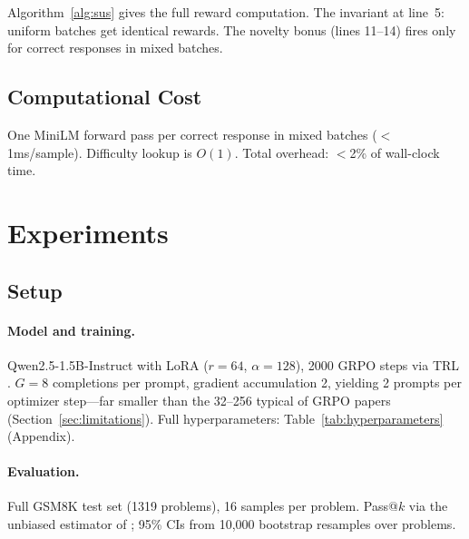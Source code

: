 \documentclass[10pt]{article}
\begin{document}


Algorithm~\ref{alg:sus} gives the full reward computation. The invariant at line~5: uniform batches get identical rewards. The novelty bonus (lines 11--14) fires only for correct responses in mixed batches.

\subsection{Computational Cost}

One MiniLM forward pass per correct response in mixed batches ($<$1ms/sample). Difficulty lookup is $O(1)$. Total overhead: $<$2\% of wall-clock time.

\section{Experiments}
\label{sec:experiments}

\subsection{Setup}
\label{sec:setup}

\paragraph{Model and training.}
Qwen2.5-1.5B-Instruct \citep{yang2025qwen2} with LoRA \citep{hu2022lora} ($r{=}64$, $\alpha{=}128$), 2000 GRPO steps via TRL \citep{vonwerra2022trl}. $G{=}8$ completions per prompt, gradient accumulation 2, yielding 2 prompts per optimizer step---far smaller than the 32--256 typical of GRPO papers (Section~\ref{sec:limitations}). Full hyperparameters: Table~\ref{tab:hyperparameters} (Appendix).

\paragraph{Evaluation.}
Full GSM8K test set \citep{cobbe2021training} (1319 problems), 16 samples per problem. Pass@$k$ via the unbiased estimator of \citet{chen2021evaluating}; 95\% CIs from 10{,}000 bootstrap resamples over problems.
\end{document}
